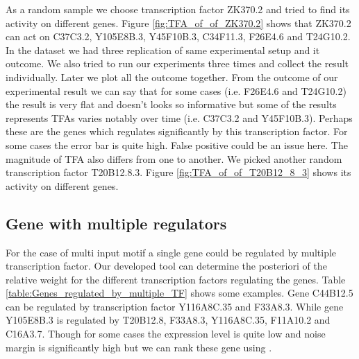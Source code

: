 As a random sample we choose transcription factor ZK370.2 and tried to find its activity on different
genes. Figure \ref{fig:TFA_of_of_ZK370.2} shows that ZK370.2 can act on C37C3.2, Y105E8B.3, Y45F10B.3,
C34F11.3, F26E4.6 and T24G10.2. In the dataset we had three replication of same experimental setup and 
it outcome. We also tried to run our experiments three times and collect the result individually. 
Later we plot all the outcome together.
From the outcome of our experimental result we can say that for some cases (i.e. F26E4.6 and T24G10.2)
the result is very flat and doesn't looks so informative but some of the results represents TFAs varies 
notably over time (i.e. C37C3.2 and Y45F10B.3). 
Perhaps these are the genes which regulates significantly by this transcription
factor. For some cases the error bar is quite high. False positive could be an issue here. The magnitude 
of TFA also differs from one to another.
We picked another random transcription factor T20B12.8.3. Figure \ref{fig:TFA_of_of_T20B12_8_3} shows its
activity on different genes.

\subsection{Gene with multiple regulators}
For the case of multi input motif a single gene could be regulated by multiple transcription factor. Our 
developed tool can determine the posteriori of the relative weight for the different transcription
factors regulating the genes. Table \ref{table:Genes_regulated_by_multiple_TF} shows some examples.
Gene C44B12.5 can be regulated by transcription factor Y116A8C.35 and F33A8.3. While gene
Y105E8B.3 is regulated by T20B12.8, F33A8.3, Y116A8C.35, F11A10.2 and C16A3.7. Though for some cases 
the expression level is quite low and noise margin is significantly high but we can rank these 
gene using \cite{Kalaitzis:2011}.


